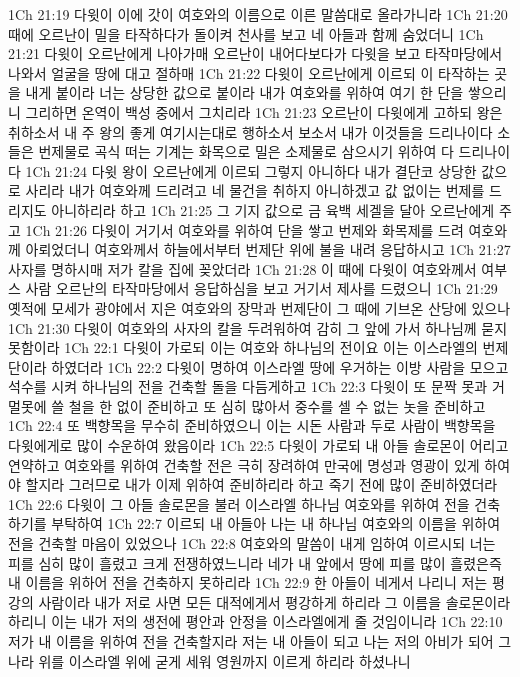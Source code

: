 1Ch 21:19  다윗이 이에 갓이 여호와의 이름으로 이른 말씀대로 올라가니라
1Ch 21:20  때에 오르난이 밀을 타작하다가 돌이켜 천사를 보고 네 아들과 함께 숨었더니
1Ch 21:21  다윗이 오르난에게 나아가매 오르난이 내어다보다가 다윗을 보고 타작마당에서 나와서 얼굴을 땅에 대고 절하매
1Ch 21:22  다윗이 오르난에게 이르되 이 타작하는 곳을 내게 붙이라 너는 상당한 값으로 붙이라 내가 여호와를 위하여 여기 한 단을 쌓으리니 그리하면 온역이 백성 중에서 그치리라
1Ch 21:23  오르난이 다윗에게 고하되 왕은 취하소서 내 주 왕의 좋게 여기시는대로 행하소서 보소서 내가 이것들을 드리나이다 소들은 번제물로 곡식 떠는 기계는 화목으로 밀은 소제물로 삼으시기 위하여 다 드리나이다
1Ch 21:24  다윗 왕이 오르난에게 이르되 그렇지 아니하다 내가 결단코 상당한 값으로 사리라 내가 여호와께 드리려고 네 물건을 취하지 아니하겠고 값 없이는 번제를 드리지도 아니하리라 하고
1Ch 21:25  그 기지 값으로 금 육백 세겔을 달아 오르난에게 주고
1Ch 21:26  다윗이 거기서 여호와를 위하여 단을 쌓고 번제와 화목제를 드려 여호와께 아뢰었더니 여호와께서 하늘에서부터 번제단 위에 불을 내려 응답하시고
1Ch 21:27  사자를 명하시매 저가 칼을 집에 꽂았더라
1Ch 21:28  이 때에 다윗이 여호와께서 여부스 사람 오르난의 타작마당에서 응답하심을 보고 거기서 제사를 드렸으니
1Ch 21:29  옛적에 모세가 광야에서 지은 여호와의 장막과 번제단이 그 때에 기브온 산당에 있으나
1Ch 21:30  다윗이 여호와의 사자의 칼을 두려워하여 감히 그 앞에 가서 하나님께 묻지 못함이라
1Ch 22:1  다윗이 가로되 이는 여호와 하나님의 전이요 이는 이스라엘의 번제단이라 하였더라
1Ch 22:2  다윗이 명하여 이스라엘 땅에 우거하는 이방 사람을 모으고 석수를 시켜 하나님의 전을 건축할 돌을 다듬게하고
1Ch 22:3  다윗이 또 문짝 못과 거멀못에 쓸 철을 한 없이 준비하고 또 심히 많아서 중수를 셀 수 없는 놋을 준비하고
1Ch 22:4  또 백향목을 무수히 준비하였으니 이는 시돈 사람과 두로 사람이 백향목을 다윗에게로 많이 수운하여 왔음이라
1Ch 22:5  다윗이 가로되 내 아들 솔로몬이 어리고 연약하고 여호와를 위하여 건축할 전은 극히 장려하여 만국에 명성과 영광이 있게 하여야 할지라 그러므로 내가 이제 위하여 준비하리라 하고 죽기 전에 많이 준비하였더라
1Ch 22:6  다윗이 그 아들 솔로몬을 불러 이스라엘 하나님 여호와를 위하여 전을 건축하기를 부탁하여
1Ch 22:7  이르되 내 아들아 나는 내 하나님 여호와의 이름을 위하여 전을 건축할 마음이 있었으나
1Ch 22:8  여호와의 말씀이 내게 임하여 이르시되 너는 피를 심히 많이 흘렸고 크게 전쟁하였느니라 네가 내 앞에서 땅에 피를 많이 흘렸은즉 내 이름을 위하어 전을 건축하지 못하리라
1Ch 22:9  한 아들이 네게서 나리니 저는 평강의 사람이라 내가 저로 사면 모든 대적에게서 평강하게 하리라 그 이름을 솔로몬이라 하리니 이는 내가 저의 생전에 평안과 안정을 이스라엘에게 줄 것임이니라
1Ch 22:10  저가 내 이름을 위하여 전을 건축할지라 저는 내 아들이 되고 나는 저의 아비가 되어 그 나라 위를 이스라엘 위에 굳게 세워 영원까지 이르게 하리라 하셨나니
